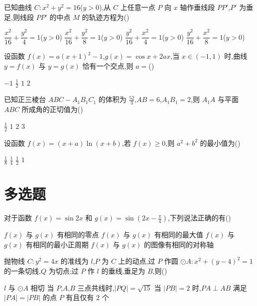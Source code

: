\begin{problem}
已知曲线 \(C:x^2+y^2=16\)(\(y>0\)),从 \(C\) 上任意一点 \(P\) 向 \(x\) 轴作垂线段 \(PP'\),\(P'\) 为垂足,则线段 \(PP'\) 的中点 \(M\) 的轨迹方程为(\quad)

\choices
    {\(\dfrac{x^2}{16}+\dfrac{y^2}{4}=1\)(\(y>0\))}
    {\(\dfrac{x^2}{16}+\dfrac{y^2}{8}=1\)(\(y>0\))}
    {\(\dfrac{y^2}{16}+\dfrac{x^2}{4}=1\)(\(y>0\))}
    {\(\dfrac{y^2}{16}+\dfrac{x^2}{8}=1\)(\(y>0\))}
\end{problem}

\begin{problem}
设函数 \(f(x)=a(x+1)^2-1\),\(g(x)=\cos x+2ax\),当 \(x\in(-1,1)\) 时,曲线 \(y=f(x)\) 与 \(y=g(x)\) 恰有一个交点,则 \(a=\)(\quad)

\choices
    {\(-1\)}
    {\(\frac12\)}
    {\(1\)}
    {\(2\)}
\end{problem}

\begin{problem}
已知正三棱台 \(ABC-A_1B_1C_1\) 的体积为 \(\frac{52}{3}\),\(AB=6\),\(A_1B_1=2\),则 \(A_1A\) 与平面 \(ABC\) 所成角的正切值为(\quad)

\choices
    {\(\frac12\)}
    {\(1\)}
    {\(2\)}
    {\(3\)}
\end{problem}

\begin{problem}
设函数 \(f(x)=(x+a)\ln(x+b)\),若 \(f(x)\ge 0\),则 \(a^2+b^2\) 的最小值为(\quad)

\choices
    {\(\frac18\)}
    {\(\frac14\)}
    {\(\frac12\)}
    {\(1\)}
\end{problem}

\section{多选题}

\begin{problem}
对于函数 \(f(x)=\sin 2x\) 和 \(g(x)=\sin\left(2x-\frac{\pi}{4}\right)\),下列说法正确的有(\quad)

\choices
    {\(f(x)\) 与 \(g(x)\) 有相同的零点}
    {\(f(x)\) 与 \(g(x)\) 有相同的最大值}
    {\(f(x)\) 与 \(g(x)\) 有相同的最小正周期}
    {\(f(x)\) 与 \(g(x)\) 的图像有相同的对称轴}
\end{problem}

\begin{problem}
抛物线 \(C:y^2=4x\) 的准线为 \(l\),\(P\) 为 \(C\) 上的动点,过 \(P\) 作圆 \(\odot A:x^2+(y-4)^2=1\) 的一条切线,\(Q\) 为切点;过 \(P\) 作 \(l\) 的垂线,垂足为 \(B\),则(\quad)

\choices
    {\(l\) 与 \(\odot A\) 相切}
    {当 \(P\),\(A\),\(B\) 三点共线时,\(|PQ|=\sqrt{15}\)}
    {当 \(|PB|=2\) 时,\(PA\perp AB\)}
    {满足 \(|PA|=|PB|\) 的点 \(P\) 有且仅有 \(2\) 个}
\end{problem}

